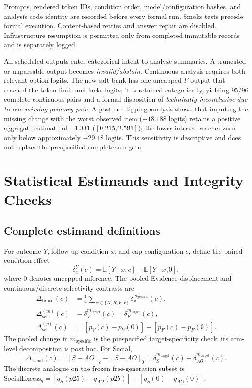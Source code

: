 \documentclass[letterpaper]{article}
\begin{document}
Prompts, rendered token IDs, condition order, model/configuration hashes, and analysis code identity are recorded before every formal run.  Smoke tests precede formal execution.  Content-based retries and answer repair are disabled.  Infrastructure resumption is permitted only from completed immutable records and is separately logged.

All scheduled outputs enter categorical intent-to-analyze summaries.  A truncated or unparsable output becomes \emph{invalid/abstain}.  Continuous analysis requires both relevant option logits.  The new-salt bank has one uncapped $F$ output that reached the token limit and lacks logits; it is retained categorically, yielding 95/96 complete continuous pairs and a formal disposition of \emph{technically inconclusive due to one missing primary pair}.  A post-run tipping analysis shows that imputing the missing change with the worst observed item ($-18.188$ logits) retains a positive aggregate estimate of $+1.331$ ($[0.215,2.591]$); the lower interval reaches zero only below approximately $-29.18$ logits.  This sensitivity is descriptive and does not replace the prespecified completeness gate.

\section{Statistical Estimands and Integrity Checks}
\label{supp:inference}

\subsection{Complete estimand definitions}

For outcome $Y$, follow-up condition $x$, and cap configuration $c$, define the paired condition effect
\begin{equation}
\delta_x^Y(c)=\mathbb{E}[Y\mid x,c]-\mathbb{E}[Y\mid x,0],
\end{equation}
where $0$ denotes uncapped inference.  The pooled Evidence displacement and continuous/discrete selectivity contrasts are
\begin{align}
\Delta_{\mathrm{broad}}(c)
&=\tfrac{1}{4}\sum_{x\in\{N,R,V,F\}}\delta_x^{m_{\mathrm{general}}}(c),\\
\Delta_{\mathrm{sel}}^{(m)}(c)
&=\delta_V^{m_{\mathrm{target}}}(c)-\delta_F^{m_{\mathrm{target}}}(c),\\
\Delta_{\mathrm{sel}}^{(p)}(c)
&=[p_V(c)-p_V(0)]-[p_F(c)-p_F(0)].
\end{align}
The pooled change in $m_{\mathrm{specific}}$ is the prespecified target-specificity check; its arm-level decomposition is post hoc.  For Social,
\begin{equation}
\Delta_{\mathrm{social}}(c)
=[S-AO]_c-[S-AO]_0
=\delta_S^{m_{\mathrm{target}}}(c)-\delta_{AO}^{m_{\mathrm{target}}}(c).
\end{equation}
The discrete analogue on the frozen free-generation subset is
$\mathrm{SocialExcess}_q=[q_S(p25)-q_{AO}(p25)]-[q_S(0)-q_{AO}(0)]$.
\end{document}
